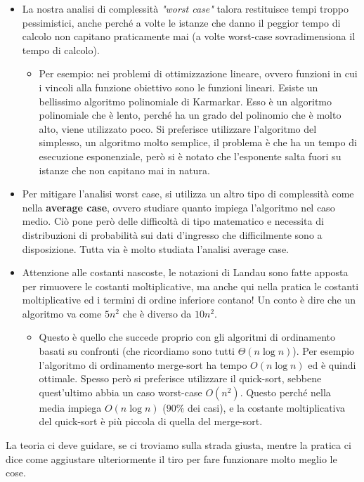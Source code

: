 \documentclass{article}
\begin{document}
\begin{itemize}
    \item La nostra analisi di complessità \textit{"worst case"} talora restituisce tempi troppo
    pessimistici, anche perché a volte le istanze che danno il peggior tempo di calcolo non capitano
    praticamente mai (a volte worst-case sovradimensiona il tempo di calcolo).
\begin{itemize}
    \item Per esempio: nei problemi di ottimizzazione lineare, ovvero funzioni in cui i vincoli
    alla funzione obiettivo sono le funzioni lineari. Esiste un bellissimo algoritmo polinomiale
    di Karmarkar. Esso è un algoritmo polinomiale che è lento, perché ha un grado del polinomio
    che è molto alto, viene utilizzato poco. Si preferisce utilizzare l'algoritmo del simplesso,
    un algoritmo molto semplice, il problema è che ha un tempo di esecuzione esponenziale, però
    si è notato che l'esponente salta fuori su istanze che non capitano mai in natura.
\end{itemize}

    \item Per mitigare l'analisi worst case, si utilizza un altro tipo di complessità come nella
    \textbf{average case}, ovvero studiare quanto impiega l'algoritmo nel caso medio. Ciò pone
    però delle difficoltà di tipo matematico e necessita di distribuzioni di probabilità sui dati
    d'ingresso che difficilmente sono a disposizione. Tutta via è molto studiata l'analisi
    average case.

    \item Attenzione alle costanti nascoste, le notazioni di Landau sono fatte apposta per
    rimuovere le costanti moltiplicative, ma anche qui nella pratica le costanti moltiplicative
    ed i termini di ordine inferiore contano! Un conto è dire che un algoritmo va come $5n^2$
    che è diverso da $10n^2$.
    \begin{itemize}
        \item Questo è quello che succede proprio con gli algoritmi di ordinamento
        basati su confronti (che ricordiamo sono tutti $\Theta (n\log n)$). Per
        esempio l'algoritmo di ordinamento merge-sort ha tempo $O(n\log n)$ ed
        è quindi ottimale. Spesso però si preferisce utilizzare il quick-sort, sebbene
        quest'ultimo abbia un caso worst-case $O(n^2)$. Questo perché nella media
        impiega $O(n\log n)$ ($90\%$ dei casi), e la costante moltiplicativa del quick-sort
        è più piccola di quella del merge-sort.
    \end{itemize}

\end{itemize}
La teoria ci deve guidare, se ci troviamo sulla strada giusta, mentre la pratica ci dice
come aggiustare ulteriormente il tiro per fare funzionare molto meglio le cose.
\end{document}
